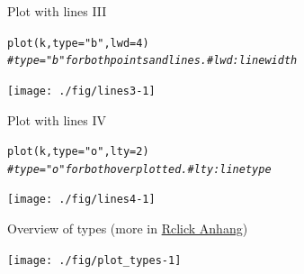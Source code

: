 \documentclass[xcolor=table,           xcolor=dvipsnames]{beamer}\usepackage[]{graphicx}\usepackage[]{color}
\makeatletter
\newcommand{\hlnum}[1]{\textcolor[rgb]{0,0,0}{#1}}
\newcommand{\hlstr}[1]{\textcolor[rgb]{0.545,0.137,0.137}{#1}}
\newcommand{\hlcom}[1]{\textcolor[rgb]{0,0.392,0}{\textit{#1}}}
\newcommand{\hlstd}[1]{\textcolor[rgb]{0,0,0}{#1}}
\newcommand{\hlkwc}[1]{\textcolor[rgb]{1,0,1}{#1}}
\newcommand{\hlkwd}[1]{\textcolor[rgb]{0,0,1}{#1}}
\newenvironment{kframe}{%
 \def\at@end@of@kframe{}%
 \ifinner\ifhmode%
  \def\at@end@of@kframe{\end{minipage}}%
  \begin{minipage}{\columnwidth}%
 \fi\fi%
 \def\FrameCommand##1{\hskip\@totalleftmargin \hskip-\fboxsep
 \colorbox{shadecolor}{##1}\hskip-\fboxsep
     \hskip-\linewidth \hskip-\@totalleftmargin \hskip\columnwidth}%
 \MakeFramed {\advance\hsize-\width
   \@totalleftmargin\z@ \linewidth\hsize
   \@setminipage}}%
 {\par\unskip\endMakeFramed%
 \at@end@of@kframe}
\newenvironment{knitrout}{}{} %
\makeatother
\begin{document}

\begin{frame}[fragile]{Plot with lines III}
\begin{knitrout}
\color{fgcolor}\begin{kframe}
\begin{alltt}
\hlkwd{plot}\hlstd{(k,} \hlkwc{type}\hlstd{=}\hlstr{"b"}\hlstd{,} \hlkwc{lwd}\hlstd{=}\hlnum{4}\hlstd{)}
\hlcom{# type="b" for both points and lines. # lwd: line width}
\end{alltt}
\end{kframe}

{\centering \texttt{[image: ./fig/lines3-1]} 

}



\end{knitrout}
\end{frame}


\begin{frame}[fragile]{Plot with lines IV}
\begin{knitrout}
\color{fgcolor}\begin{kframe}
\begin{alltt}
\hlkwd{plot}\hlstd{(k,} \hlkwc{type}\hlstd{=}\hlstr{"o"}\hlstd{,} \hlkwc{lty}\hlstd{=}\hlnum{2}\hlstd{)}
\hlcom{# type="o" for both overplotted. # lty: line type}
\end{alltt}
\end{kframe}

{\centering \texttt{[image: ./fig/lines4-1]} 

}



\end{knitrout}
\end{frame}


\begin{frame}[fragile]{Overview of types (more in \href{https://dl.dropboxusercontent.com/u/4836866/Rclick/Anhang.pdf}{Rclick Anhang})}
\begin{knitrout}
\color{fgcolor}

{\centering \texttt{[image: ./fig/plot\_types-1]} 

}



\end{knitrout}
\end{frame}
\end{document}
